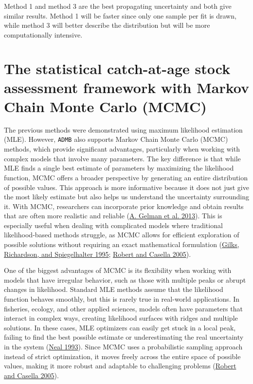 \documentclass[
]{book}
\begin{document}
Method 1 and method 3 are the best propagating uncertainty and both give similar results. Method 1 will be faster since only one sample per fit is drawn, while method 3 will better describe the distribution but will be more computationally intensive.

\hypertarget{the-statistical-catch-at-age-stock-assessment-framework-with-markov-chain-monte-carlo-mcmc}{%
\chapter{\texorpdfstring{The statistical catch-at-age stock assessment framework with Markov Chain Monte Carlo (MCMC) \label{sec:mcmc}}{The statistical catch-at-age stock assessment framework with Markov Chain Monte Carlo (MCMC) }}\label{the-statistical-catch-at-age-stock-assessment-framework-with-markov-chain-monte-carlo-mcmc}}

The previous methods were demonstrated using maximum likelihood estimation (MLE). However, \texttt{ADMB} also supports Markov Chain Monte Carlo (MCMC) methods, which provide significant advantages, particularly when working with complex models that involve many parameters. The key difference is that while MLE finds a single best estimate of parameters by maximizing the likelihood function, MCMC offers a broader perspective by generating an entire distribution of possible values. This approach is more informative because it does not just give the most likely estimate but also helps us understand the uncertainty surrounding it. With MCMC, researchers can incorporate prior knowledge and obtain results that are often more realistic and reliable (\protect\hyperlink{ref-gelman2013bayesian}{A. Gelman et al. 2013}). This is especially useful when dealing with complicated models where traditional likelihood-based methods struggle, as MCMC allows for efficient exploration of possible solutions without requiring an exact mathematical formulation (\protect\hyperlink{ref-gilks1995markov}{Gilks, Richardson, and Spiegelhalter 1995}; \protect\hyperlink{ref-robert2005monte}{Robert and Casella 2005}).

One of the biggest advantages of MCMC is its flexibility when working with models that have irregular behavior, such as those with multiple peaks or abrupt changes in likelihood. Standard MLE methods assume that the likelihood function behaves smoothly, but this is rarely true in real-world applications. In fisheries, ecology, and other applied sciences, models often have parameters that interact in complex ways, creating likelihood surfaces with ridges and multiple solutions. In these cases, MLE optimizers can easily get stuck in a local peak, failing to find the best possible estimate or underestimating the real uncertainty in the system (\protect\hyperlink{ref-neal1993probabilistic}{Neal 1993}). Since MCMC uses a probabilistic sampling approach instead of strict optimization, it moves freely across the entire space of possible values, making it more robust and adaptable to challenging problems (\protect\hyperlink{ref-robert2005monte}{Robert and Casella 2005}).
\end{document}
